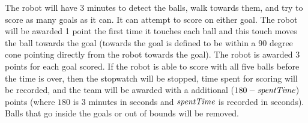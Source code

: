 \documentclass[12pt]{article}
\begin{document}
The robot will have 3 minutes to detect the balls, walk towards them, and try to score as many goals as it can. It can attempt to score on either goal. The robot will be awarded 1 point the first time it touches each ball and this touch moves the ball towards the goal (towards the goal is defined to be within a 90 degree cone pointing directly from the robot towards the goal).  The robot is awarded 3 points for each goal scored.  If the robot is able to score with all five balls before the time is over, then the stopwatch will be stopped, time spent for scoring will be recorded, and the team will be awarded with a additional ($180 - \emph{spentTime}$) points (where $180$ is 3 minutes in seconds and $\emph{spentTime}$ is recorded in seconds). Balls that go inside the goals or out of bounds will be removed.
\end{document}
